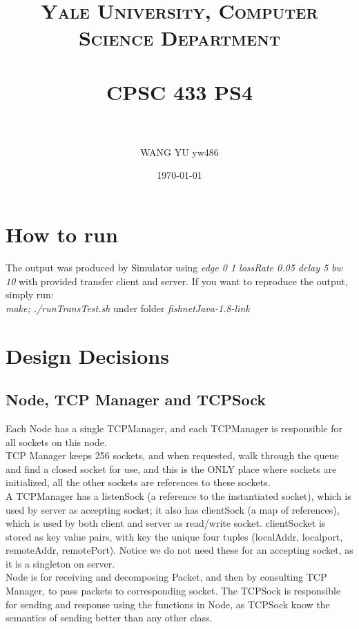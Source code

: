 \documentclass[paper=a4, fontsize=11pt]{scrartcl} %
\title{	
\normalfont \normalsize 
\textsc{Yale University, Computer Science Department} \\ [25pt] %
\horrule{0.5pt} \\[0.4cm] %
\huge CPSC 433 PS4 \\ %
\horrule{2pt} \\[0.5cm] %
}
\author{WANG YU yw486} %
\date{\normalsize\today} %
\numberwithin{equation}{section} %
\numberwithin{figure}{section} %
\numberwithin{table}{section} %
\begin{document}
\maketitle %

\section{How to run}
The output was produced by Simulator using \textit{edge 0 1 lossRate 0.05 delay 5 bw 10} with provided transfer client and server. If you want to reproduce the output, simply run:\\
\textit{make; ./runTransTest.sh} under folder \textit{fishnetJava-1.8-link}

\section{Design Decisions}
\subsection{Node, TCP Manager and TCPSock}
Each Node has a single TCPManager, and each TCPManager is responsible for all sockets on this node.\\

TCP Manager keeps 256 sockets, and when requested, walk through the queue and find a closed socket for use, and this is the ONLY place where sockets are initialized, all the other sockets are references to these sockets.\\ 

A TCPManager has a listenSock (a reference to the instantiated socket), which is used by server as accepting socket; it also has clientSock (a map of references), which is used by both client and server as read/write socket. clientSocket is stored as key value pairs, with key the unique four tuples (localAddr, localport, remoteAddr, remotePort). Notice we do not need these for an accepting socket, as it is a singleton on server.\\

Node is for receiving and decomposing Packet, and then by consulting TCP Manager, to pass packets to corresponding socket. The TCPSock is responsible for sending and response using the functions in Node, as TCPSock know the semantics of sending better than any other class.\\
 
\end{document}
